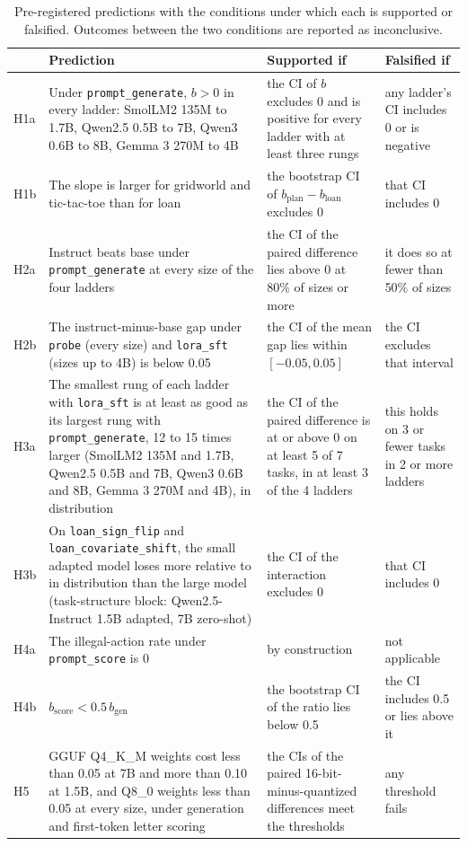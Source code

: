 \begin{table}[h]
\centering\small
\caption{Pre-registered predictions with the conditions under which each is supported or falsified. Outcomes between the two conditions are reported as inconclusive.}
\label{tab:prereg}
\begin{tabularx}{\linewidth}{@{}l X X X@{}}
\toprule
& Prediction & Supported if & Falsified if\\
\midrule
H1a & Under \texttt{prompt\_generate}, $b>0$ in every ladder: SmolLM2 135M to 1.7B, Qwen2.5 0.5B to 7B, Qwen3 0.6B to 8B, Gemma 3 270M to 4B & the CI of $b$ excludes 0 and is positive for every ladder with at least three rungs & any ladder's CI includes 0 or is negative\\
H1b & The slope is larger for gridworld and tic-tac-toe than for loan & the bootstrap CI of $b_{\text{plan}}-b_{\text{loan}}$ excludes 0 & that CI includes 0\\
H2a & Instruct beats base under \texttt{prompt\_generate} at every size of the four ladders & the CI of the paired difference lies above 0 at 80\% of sizes or more & it does so at fewer than 50\% of sizes\\
H2b & The instruct-minus-base gap under \texttt{probe} (every size) and \texttt{lora\_sft} (sizes up to 4B) is below 0.05 & the CI of the mean gap lies within $[-0.05, 0.05]$ & the CI excludes that interval\\
H3a & The smallest rung of each ladder with \texttt{lora\_sft} is at least as good as its largest rung with \texttt{prompt\_generate}, 12 to 15 times larger (SmolLM2 135M and 1.7B, Qwen2.5 0.5B and 7B, Qwen3 0.6B and 8B, Gemma 3 270M and 4B), in distribution & the CI of the paired difference is at or above 0 on at least 5 of 7 tasks, in at least 3 of the 4 ladders & this holds on 3 or fewer tasks in 2 or more ladders\\
H3b & On \texttt{loan\_sign\_flip} and \texttt{loan\_covariate\_shift}, the small adapted model loses more relative to in distribution than the large model (task-structure block: Qwen2.5-Instruct 1.5B adapted, 7B zero-shot) & the CI of the interaction excludes 0 & that CI includes 0\\
H4a & The illegal-action rate under \texttt{prompt\_score} is 0 & by construction & not applicable\\
H4b & $b_{\text{score}} < 0.5\,b_{\text{gen}}$ & the bootstrap CI of the ratio lies below 0.5 & the CI includes 0.5 or lies above it\\
H5 & GGUF Q4\_K\_M weights cost less than 0.05 at 7B and more than 0.10 at 1.5B, and Q8\_0 weights less than 0.05 at every size, under generation and first-token letter scoring & the CIs of the paired 16-bit-minus-quantized differences meet the thresholds & any threshold fails\\

\end{tabularx}
\end{table}
